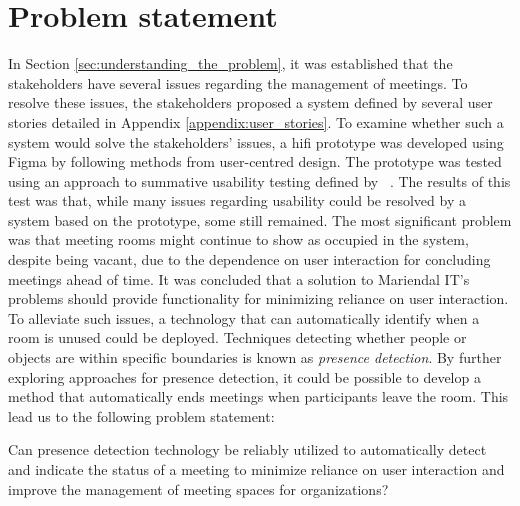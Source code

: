 \section{Problem statement}\label{sec:problem_statement}
In Section \ref{sec:understanding_the_problem}, it was established that the stakeholders have several issues regarding the management of meetings. 
To resolve these issues, the stakeholders proposed a system defined by several user stories detailed in Appendix \ref{appendix:user_stories}. 
To examine whether such a system would solve the stakeholders' issues, a hifi prototype was developed using Figma\cite{Figma} by following methods from user-centred design.
The prototype was tested using an approach to summative usability testing defined by \citeauthor{lazar2005web}~\cite{lazar2005web}. 
The results of this test was that, while many issues regarding usability could be resolved by a system based on the prototype, some still remained. 
The most significant problem was that meeting rooms might continue to show as occupied in the system, despite being vacant, due to the dependence on user interaction for concluding meetings ahead of time.
It was concluded that a solution to Mariendal IT's problems should provide functionality for minimizing reliance on user interaction.
To alleviate such issues, a technology that can automatically identify when a room is unused could be deployed. 
Techniques detecting whether people or objects are within specific boundaries is known as \textit{presence detection}.
By further exploring approaches for presence detection, it could be possible to develop a method that automatically ends meetings when participants leave the room.
This lead us to the following problem statement:
\begin{problem_statement}
    Can presence detection technology be reliably utilized to automatically detect and indicate the status of a meeting to minimize reliance on user interaction and improve the management of meeting spaces for organizations? 
\end{problem_statement}

